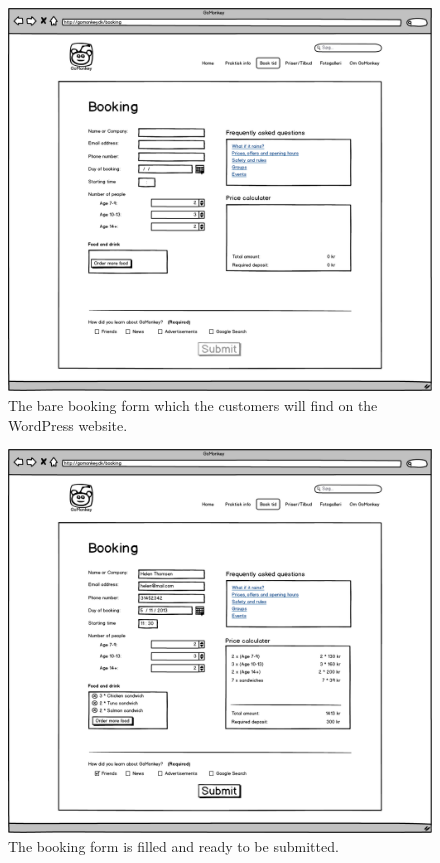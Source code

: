 \begin{figure}[htbp]
    \centering
        \includegraphics[width=.8\textwidth]{figures/mockup/booking_initial.png}
	    \caption{The bare booking form which the customers will find on the WordPress website.}
        \label{fig:bookinitial}
\end{figure}
\begin{figure}[htbp]
    \centering
        \includegraphics[width=.8\textwidth]{figures/mockup/booking_filled.png}
	    \caption{The booking form is filled and ready to be submitted.}
        \label{fig:bookfilled}
\end{figure}
